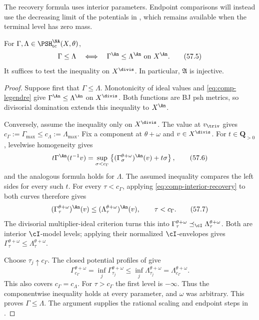 The recovery formula uses interior parameters. Endpoint comparisons
will instead use the decreasing limit of the potentials in
, which remains available when the
terminal level has zero mass.

\begin{proposition}\label{prop:comp-order-reflection}
For $\Gamma,\Lambda\in\PSH^{\NA}_{\mathrm{tc}}(X,\theta)$,
\[
            \Gamma\leq\Lambda
       \quad\Longleftrightarrow\quad
            \Gamma^{\An}\leq\Lambda^{\An}
            \text{ on }X^{\An}.
\tag{57.5}\label{eq:comp-order-equivalence}
\]
It suffices to test the inequality on $X^{\divis}$.
In particular, $\mathfrak A$ is injective.
\end{proposition}

\begin{proof}
Suppose first that $\Gamma\leq\Lambda$.
Monotonicity of ideal values and \eqref{eq:comp-legendre} give
$\Gamma^{\An}\leq\Lambda^{\An}$ on $X^{\divis}$.
Both functions are BJ psh metrics, so divisorial domination
\cite[Theorem~4.22]{BJ22} extends this inequality to $X^{\An}$.

Conversely, assume the inequality only on $X^{\divis}$.
The value at $v_{\triv}$ gives
$c_\Gamma:=\Gamma_{\max}\leq c_\Lambda:=\Lambda_{\max}$.
Fix a component at $\theta+\omega$ and $v\in X^{\divis}$.
For $t\in\mathbf Q_{>0}$, levelwise homogeneity gives
\[
 t\Gamma^{\An}(t^{-1}v)
   =\sup_{\sigma<c_\Gamma}
       \left\{(\Gamma_\sigma^{\theta+\omega})^{\An}(v)
                    +t\sigma\right\},
\tag{57.6}\label{eq:comp-scaled-legendre}
\]
and the analogous formula holds for $\Lambda$.
The assumed inequality compares the left sides for every such $t$.
For every $\tau<c_\Gamma$, applying
\eqref{eq:comp-interior-recovery} to both curves therefore gives
\[
 (\Gamma_\tau^{\theta+\omega})^{\An}(v)
 \leq
 (\Lambda_\tau^{\theta+\omega})^{\An}(v),
                         \qquad \tau<c_\Gamma.
\tag{57.7}\label{eq:comp-level-valuations}
\]
The divisorial multiplier-ideal criterion turns this into
$\Gamma_\tau^{\theta+\omega}\preceq_{\cI}
\Lambda_\tau^{\theta+\omega}$.
Both are interior $\cI$-model levels; applying their normalized
$\cI$-envelopes gives
$\Gamma_\tau^{\theta+\omega}\leq
\Lambda_\tau^{\theta+\omega}$.

Choose $\tau_j\uparrow c_\Gamma$. The closed potential profiles
of  give
\[
 \Gamma_{c_\Gamma}^{\theta+\omega}
    =\inf_j\Gamma_{\tau_j}^{\theta+\omega}
    \leq\inf_j\Lambda_{\tau_j}^{\theta+\omega}
    =\Lambda_{c_\Gamma}^{\theta+\omega}.
\]
This also covers $c_\Gamma=c_\Lambda$.
For $\tau>c_\Gamma$ the first level is $-\infty$.
Thus the componentwise inequality holds at every parameter, and
$\omega$ was arbitrary. This proves $\Gamma\leq\Lambda$.
The argument supplies the rational scaling and endpoint steps in
\cite[Theorem~3.12(i) and Theorem~3.14]{DXZ23}.
\end{proof}

